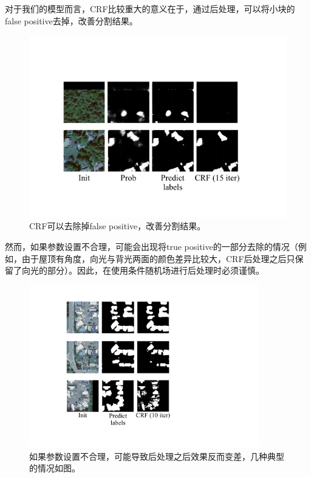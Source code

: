 \documentclass[a4paper,12pt]{article}
\begin{document}
\begin{CJK*}{UTF8}{gbsn}
\begin{spacing}{1.2}
    对于我们的模型而言，CRF比较重大的意义在于，通过后处理，可以将小块的false positive去掉，改善分割结果。
    \begin{figure} [!]
    \centering
    \includegraphics[width=14.0cm]{CRF_2.pdf}
    \caption{CRF可以去除掉false positive，改善分割结果。}
    \label{fig:Fig 2}
    \end{figure}
    然而，如果参数设置不合理，可能会出现将true positive的一部分去除的情况（例如，由于屋顶有角度，向光与背光两面的颜色差异比较大，CRF后处理之后只保留了向光的部分）。因此，在使用条件随机场进行后处理时必须谨慎。
    \begin{figure} [!]
    \centering
    \includegraphics[width=10.0cm]{CRF_3.pdf}
    \caption{如果参数设置不合理，可能导致后处理之后效果反而变差，几种典型的情况如图。}
    \label{fig:Fig 3}
    \end{figure}

    
    
    
\end{spacing}
\end{CJK*}
\end{document}
